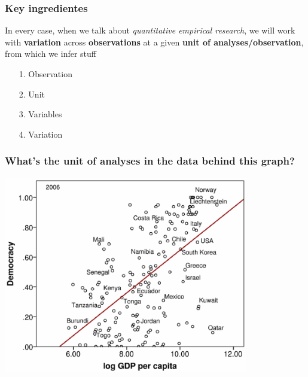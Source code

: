 \documentclass[aspectratio=43]{beamer}
\begin{document}
\begin{frame}
\frametitle{Key ingredientes}
\centering

\begin{flushleft}
In every case, when we talk about \textit{quantitative empirical research}, we will work with \textbf{variation} across \textbf{observations} at a given \textbf{unit of analyses/observation}, from which we infer stuff
\end{flushleft}


\vspace{10pt}

\begin{itemize}[<+->]
  \item[1.] Observation
  \item[2.] Unit
  \item[3.] Variables
  \item[4.] Variation
\end{itemize}

\end{frame}

\begin{frame}
\frametitle{What's the unit of analyses in the data behind this graph?}
\centering

\includegraphics[width = 0.8\textwidth]{img/ua1}

\end{frame}

\end{document}
